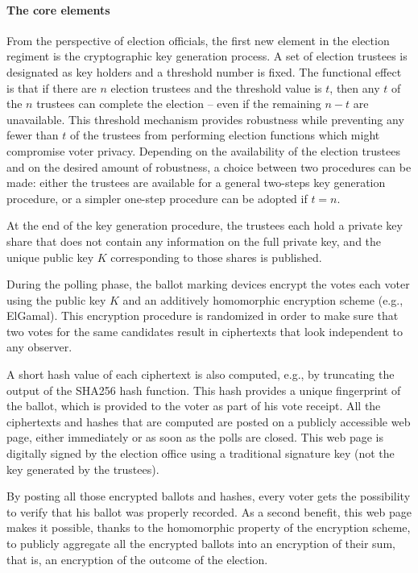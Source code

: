 \label{sec:crypto}


\paragraph{The core elements}
\label{sec:crypto-core}

From the perspective of election officials, the first new element in
the election regiment is the cryptographic key generation process. A
set of election trustees is designated as key holders and a threshold
number is fixed. The functional effect is that if there are $n$
election trustees and the threshold value is $t$, then any $t$ of the
$n$ trustees can complete the election – even if the remaining $n-t$
are unavailable. This threshold mechanism provides robustness while
preventing any fewer than $t$ of the trustees from performing election
functions which might compromise voter privacy. Depending on the
availability of the election trustees and on the desired amount of
robustness, a choice between two procedures can be made: either the
trustees are available for a general two-steps key generation
procedure, or a simpler one-step procedure can be adopted if $t=n$.

At the end of the key generation procedure, the trustees each hold a
private key share that does not contain any information on the full
private key, and the unique public key $K$ corresponding to those
shares is published.

During the polling phase, the ballot marking devices encrypt the votes
each voter using the public key $K$ and an additively homomorphic
encryption scheme (e.g., ElGamal). This encryption procedure is
randomized in order to make sure that two votes for the same
candidates result in ciphertexts that look independent to any
observer. 

A short hash value of each ciphertext is also computed, e.g., by
truncating the output of the SHA256 hash function.  This hash provides
a unique fingerprint of the ballot, which is provided to the voter as
part of his vote receipt. All the ciphertexts and hashes that are
computed are posted on a publicly accessible web page, either
immediately or as soon as the polls are closed. This web page is
digitally signed by the election office using a traditional signature
key (not the key generated by the trustees).

By posting all those encrypted ballots and hashes, every voter gets
the possibility to verify that his ballot was properly recorded. As a
second benefit, this web page makes it possible, thanks to the
homomorphic property of the encryption scheme, to publicly aggregate
all the encrypted ballots into an encryption of their sum, that is, an
encryption of the outcome of the election.

